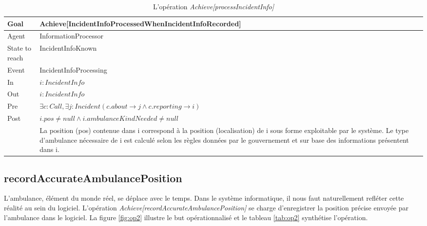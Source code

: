 	\begin{table}[!h] \centering
		\begin{tabularx}{\textwidth}{|l|X|} \hline
			Goal & Achieve[IncidentInfoProcessedWhenIncidentInfoRecorded] \\ \hline
			Agent & InformationProcessor \\ \hline
			State to reach & IncidentInfoKnown \\ \hline
			Event & IncidentInfoProcessing \\ \hline
			In & $i: IncidentInfo$ \\ \hline
			Out & $i: IncidentInfo$ \\ \hline
			Pre & $\exists c: Call, \exists j: Incident (c.about \rightarrow j \wedge c.reporting \rightarrow i)$ \\ \hline
			Post & $i.pos \neq null \wedge i.ambulanceKindNeeded \neq null $  \\
				 & La position (pos) contenue dans i correspond à la position (localisation) de i sous forme exploitable par le système. 
				  Le type d'ambulance nécessaire de i est calculé selon les règles données par le gouvernement et sur base des 
				  informations présentent dans i. \\ \hline
		\end{tabularx}
		\caption{L'opération \textit{Achieve[processIncidentInfo]}}\label{tab:op1}
	\end{table}

\subsection{recordAccurateAmbulancePosition}
	
	L'ambulance, élément du monde réel, se déplace avec le temps. Dans le système
	informatique, il nous faut naturellement refléter cette réalité au 
	sein du logiciel. L'opération \textit{Achieve[recordAccurateAmbulancePosition]}
	se charge d'enregistrer la position précise envoyée par l'ambulance
	dans le logiciel. La figure \ref{fig:op2} illustre
	le but opérationnalisé et le tableau \ref{tab:op2} synthétise l'opération.
	
	
